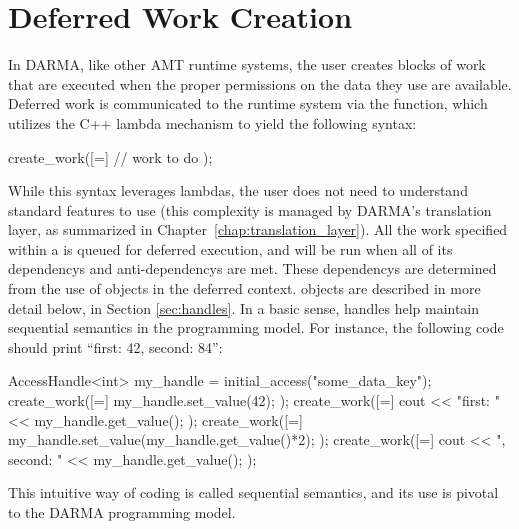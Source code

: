 \section{Deferred Work Creation}
\label{sec:deferred}
In DARMA, like other AMT runtime systems, the user creates blocks of work that
are executed when the proper permissions on the data they use are available. 
Deferred work is communicated to the runtime system via the
 function, which utilizes the C++ lambda mechanism to
yield the following syntax:
\begin{CppCode}
  create_work([=]{
    // work to do
  });
\end{CppCode}

While this syntax leverages  lambdas, the user does not need to understand
 standard features to use  (this
complexity is managed by DARMA's translation layer, as summarized in
Chapter~\ref{chap:translation_layer}). All the work specified within a
 is queued for deferred execution, and will be run when
all of its \glspl{dependency} and \glspl{anti-dependency} are met.  
These \glspl{dependency} are determined from the use of 
 objects in the deferred context. 
 objects are described in more detail below, in
Section \ref{sec:handles}.  In a basic sense, handles help maintain
\gls{sequential semantics} in the programming model.  For instance, the
following code should print ``first: 42, second: 84'':
\begin{CppCode}
AccessHandle<int> my_handle = initial_access("some_data_key");
create_work([=]{
  my_handle.set_value(42);
});
create_work([=]{
  cout << "first: " << my_handle.get_value();
});
create_work([=]{
  my_handle.set_value(my_handle.get_value()*2);
});
create_work([=]{
  cout << ", second: " << my_handle.get_value();
});
\end{CppCode}
This intuitive way of coding is called \gls{sequential semantics}, 
and its use is pivotal to the DARMA programming model.

